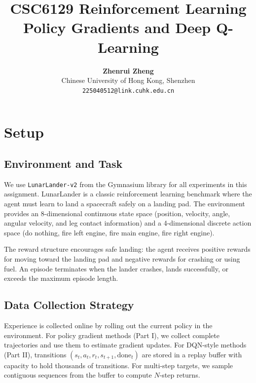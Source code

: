 \documentclass[11pt, a4paper, oneside]{memoir}
\title{\huge\textbf{CSC6129 Reinforcement Learning\\Policy Gradients and Deep Q-Learning}\vspace{-0.5cm}}
\author{\textbf{Zhenrui Zheng} \vspace{0.5cm} \\ \small Chinese University of Hong Kong, Shenzhen \\ \small\texttt{225040512@link.cuhk.edu.cn}}
\date{}
\begin{document}
\begin{titlingpage}
\maketitle
\renewcommand{\contentsname}{\huge Contents \vspace{-1cm}}
\begin{KeepFromToc}
\tableofcontents
\end{KeepFromToc}
\end{titlingpage}

\chapter{Setup}
\label{ch:setup}

\section{Environment and Task}

We use \texttt{LunarLander-v2} from the Gymnasium library for all experiments in this assignment. LunarLander is a classic reinforcement learning benchmark where the agent must learn to land a spacecraft safely on a landing pad. The environment provides an 8-dimensional continuous state space (position, velocity, angle, angular velocity, and leg contact information) and a 4-dimensional discrete action space (do nothing, fire left engine, fire main engine, fire right engine).

The reward structure encourages safe landing: the agent receives positive rewards for moving toward the landing pad and negative rewards for crashing or using fuel. An episode terminates when the lander crashes, lands successfully, or exceeds the maximum episode length.

\section{Data Collection Strategy}

Experience is collected online by rolling out the current policy in the environment. For policy gradient methods (Part I), we collect complete trajectories and use them to estimate gradient updates. For DQN-style methods (Part II), transitions $(s_t, a_t, r_t, s_{t+1}, \text{done}_t)$ are stored in a replay buffer with capacity to hold thousands of transitions. For multi-step targets, we sample contiguous sequences from the buffer to compute $N$-step returns.
\end{document}
